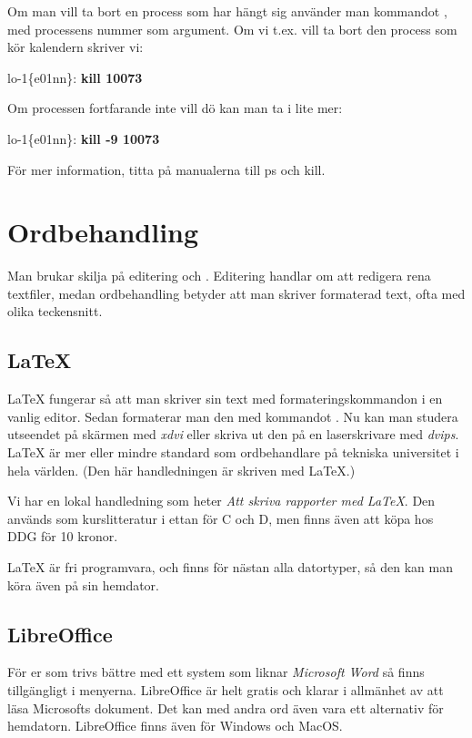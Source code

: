 \documentclass[a4paper,twocolumn]{book}
\begin{document}
Om man vill ta bort en process som har hängt sig använder man
kommandot , med processens nummer som argument.
Om vi t.ex. vill ta bort den process som kör
kalendern skriver vi:
\begin{example}
  lo-1\{e01nn\}: \textbf{kill 10073}
\end{example}
Om processen fortfarande inte vill dö kan man ta i lite mer:
\begin{example}
  lo-1\{e01nn\}: \textbf{kill -9 10073}
\end{example}
För mer information, titta på manualerna till ps och kill.

\section{Ordbehandling}

Man brukar skilja på editering och . Editering
handlar om att redigera rena textfiler, medan ordbehandling betyder
att man skriver formaterad text, ofta med olika teckensnitt.

\subsection{\LaTeX}

\LaTeX{} fungerar så
att man skriver sin text med formateringskommandon i en vanlig
editor. Sedan formaterar man den med kommandot . Nu
kan man studera utseendet på skärmen med \emph{xdvi} eller skriva ut
den på en laserskrivare med \emph{dvips}. \LaTeX{} är mer eller mindre
standard som ordbehandlare på tekniska universitet i hela världen.  (Den
här handledningen är skriven med \LaTeX.)

Vi har en lokal handledning som heter \emph{Att skriva rapporter med
  \LaTeX}. Den används som kurslitteratur i ettan för C och D, men finns även
att köpa hos DDG för 10 kronor.

\LaTeX{} är fri programvara, och finns för nästan alla datortyper, så
den kan man köra även på sin hemdator.

\subsection{LibreOffice}

För er som trivs bättre med ett system som liknar \emph{Microsoft Word}
så finns  tillgängligt i menyerna. LibreOffice är helt
gratis och klarar i allmänhet av att läsa Microsofts dokument. Det kan med
andra ord även vara ett alternativ för hemdatorn. LibreOffice finns även för
Windows och MacOS.
\end{document}
